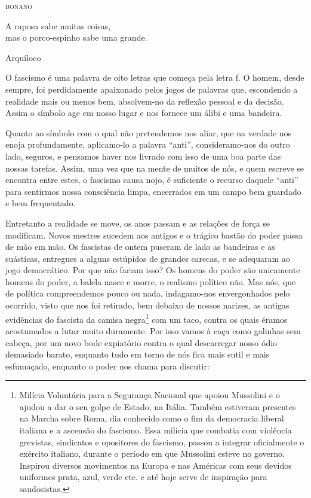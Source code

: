 \hfill{}\textsc{bonano}

\bigskip

\epigraph{A raposa sabe muitas coisas,\\mas o porco-espinho sabe uma grande.}{Arquíloco}


O fascismo é uma palavra de oito letras que começa pela letra f. O
homem, desde sempre, foi perdidamente apaixonado pelos jogos de palavras
que, escondendo a realidade mais ou menos bem, absolvem-no da reflexão
pessoal e da decisão. Assim o símbolo age em nosso lugar e nos fornece
um álibi e uma bandeira.

Quanto ao símbolo com o qual não pretendemos nos aliar, que na verdade
nos enoja profundamente, aplicamo-lo a palavra ``anti'', consideramo-nos
do outro lado, seguros, e pensamos haver nos livrado com isso de uma boa
parte das nossas tarefas. Assim, uma vez que na mente de muitos de nós,
e quem escreve se encontra entre estes, o fascismo causa nojo, é
suficiente o recurso daquele ``anti'' para sentirmos nossa consciência
limpa, encerrados em um campo bem guardado e bem frequentado.

Entretanto a realidade se move, os anos passam e as relações de força se
modificam. Novos mestres sucedem aos antigos e o trágico bastão do poder
passa de mão em mão. Os fascistas de ontem puseram de lado as bandeiras
e as suásticas, entregues a alguns estúpidos de grandes carecas, e se
adequaram ao jogo democrático. Por que não fariam isso? Os homens do
poder são unicamente homens do poder, a balela nasce e morre, o realismo
político não. Mas nós, que de política compreendemos pouco ou nada,
indagamo-nos envergonhados pelo ocorrido, visto que nos foi retirado,
bem debaixo de nossos narizes, as antigas evidências do fascista da
camisa negra\footnote{Milícia Voluntária para a Segurança Nacional que apoiou Mussolini e o
  ajudou a dar o seu golpe de Estado, na Itália. Também estiveram
  presentes na Marcha sobre Roma, dia conhecido como o fim da democracia
  liberal italiana e a ascensão do fascismo. Essa milícia que combatia
  com violência grevistas, sindicatos e opositores do fascismo, passou a
  integrar oficialmente o exército italiano, durante o período em que
  Mussolini esteve no governo. Inspirou diversos movimentos na Europa e
  nas Américas com seus devidos uniformes prata, azul, verde etc. e até
  hoje serve de inspiração para saudosistas.} com um taco, contra os quais éramos acostumados a lutar
muito duramente. Por isso vamos à caça como galinhas sem cabeça, por um
novo bode expiatório contra o qual descarregar nosso ódio demasiado
barato, enquanto tudo em torno de nós fica mais sutil e mais esfumaçado,
enquanto o poder nos chama para discutir:

